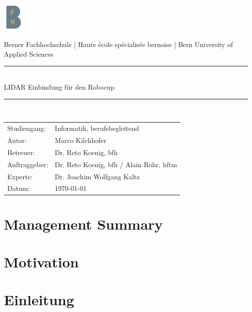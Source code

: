 \documentclass[11pt,english,german]{report}
\begin{document}
\begin{titlepage}
\begin{center}
	
\includegraphics[width=0.08\textwidth]{img/logo/bfh_logo.png}

Berner Fachhochschule | Haute école spécialisée bernoise | Bern University of Applied Sciences
\vspace{20mm}

\newcommand{\HRule}{\rule{\linewidth}{0.3mm}}
\HRule \\[0.4cm]
{\huge LIDAR Einbindung für den Robocup}\\[0.3cm]
{\huge \bfseries  }
\HRule \\[2cm]


\vfill
\end{center}
\begin{tabular}{ll}
	Studiengang:  & Informatik, berufsbegleitend \\
	Autor:        & Marco Kilchhofer \\
	Betreuer:     & Dr. Reto Koenig, \acrshort{bfh}\\
	Auftraggeber: & Dr. Reto Koenig, \acrshort{bfh} / Alain Rohr, \acrshort{hftm}\\
	Experte:      & Dr. Joachim Wolfgang Kaltz\\
	Datum:        & \today\\
\end{tabular}

\end{titlepage}


\tableofcontents

\chapter*{Management Summary}


\chapter*{Motivation}



\chapter{Einleitung}
\end{document}
